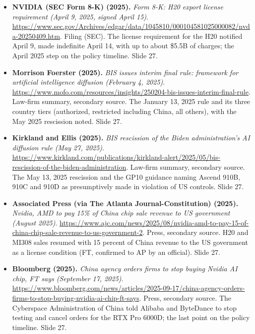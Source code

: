 \documentclass[11pt,letterpaper]{article}
\begin{document}
\begin{itemize}[leftmargin=1.2em,itemsep=3pt]
\item \textbf{NVIDIA (SEC Form 8-K) (2025).} \textit{Form 8-K: H20 export license requirement (April 9, 2025, signed April 15)}. \url{https://www.sec.gov/Archives/edgar/data/1045810/000104581025000082/nvda-20250409.htm}. Filing (SEC). The license requirement for the H20 notified April 9, made indefinite April 14, with up to about \$5.5B of charges; the April 2025 step on the policy timeline. Slide 27.
\item \textbf{Morrison Foerster (2025).} \textit{BIS issues interim final rule: framework for artificial intelligence diffusion (February 4, 2025)}. \url{https://www.mofo.com/resources/insights/250204-bis-issues-interim-final-rule}. Law-firm summary, secondary source. The January 13, 2025 rule and its three country tiers (authorized, restricted including China, all others), with the May 2025 rescission noted. Slide 27.
\item \textbf{Kirkland and Ellis (2025).} \textit{BIS rescission of the Biden administration's AI diffusion rule (May 27, 2025)}. \url{https://www.kirkland.com/publications/kirkland-alert/2025/05/bis-rescission-of-the-biden-administration}. Law-firm summary, secondary source. The May 13, 2025 rescission and the GP10 guidance naming Ascend 910B, 910C and 910D as presumptively made in violation of US controls. Slide 27.
\item \textbf{Associated Press (via The Atlanta Journal-Constitution) (2025).} \textit{Nvidia, AMD to pay 15\% of China chip sale revenue to US government (August 2025)}. \url{https://www.ajc.com/news/2025/08/nvidia-amd-to-pay-15-of-china-chip-sale-revenue-to-us-government-2}. Press, secondary source. H20 and MI308 sales resumed with 15 percent of China revenue to the US government as a license condition (FT, confirmed to AP by an official). Slide 27.
\item \textbf{Bloomberg (2025).} \textit{China agency orders firms to stop buying Nvidia AI chip, FT says (September 17, 2025)}. \url{https://www.bloomberg.com/news/articles/2025-09-17/china-agency-orders-firms-to-stop-buying-nvidia-ai-chip-ft-says}. Press, secondary source. The Cyberspace Administration of China told Alibaba and ByteDance to stop testing and cancel orders for the RTX Pro 6000D; the last point on the policy timeline. Slide 27.
\end{itemize}
\end{document}
